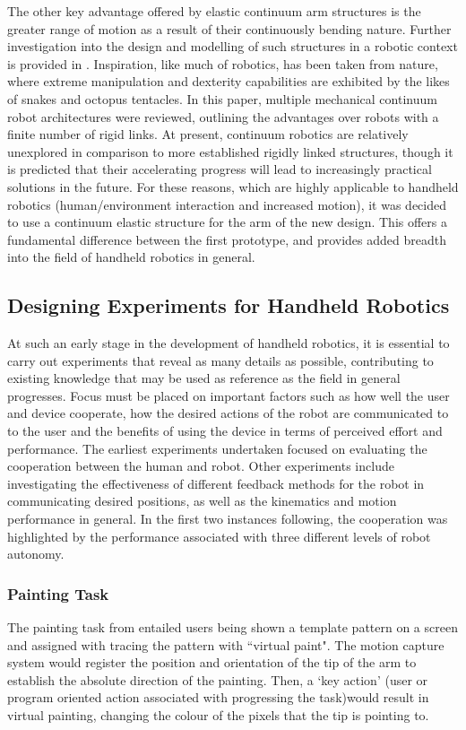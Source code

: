 \documentclass[11pt]{article}
\begin{document}
The other key advantage offered by elastic continuum arm structures is the greater range of motion as a result of their continuously bending nature. Further investigation into the design and modelling of such structures in a robotic context is provided in \cite{webster2010}. Inspiration, like much of robotics, has been taken from nature, where extreme manipulation and dexterity capabilities are exhibited by the likes of snakes and octopus tentacles. In this paper, multiple mechanical continuum robot architectures were reviewed, outlining the advantages over robots with a finite number of rigid links. At present, continuum robotics are relatively unexplored in comparison to more established rigidly linked structures, though it is predicted that their accelerating progress will lead to increasingly practical solutions in the future. For these reasons, which are highly applicable to handheld robotics (human/environment interaction and increased motion), it was decided to use a continuum elastic structure for the arm of the new design. This offers a fundamental difference between the first prototype, and provides added breadth into the field of handheld robotics in general.




\subsection{Designing Experiments for Handheld Robotics} \label{designingexperiments}
At such an early stage in the development of handheld robotics, it is essential to carry out experiments that reveal as many details as possible, contributing to existing knowledge that may be used as reference as the field in general progresses. Focus must be placed on important factors such as how well the user and device cooperate, how the desired actions of the robot are communicated to to the user and the benefits of using the device in terms of perceived effort and performance. The earliest experiments undertaken focused on evaluating the cooperation between the human and robot. Other experiments include investigating the effectiveness of different feedback methods for the robot in communicating desired positions, as well as the kinematics and motion performance in general. In the first two instances following, the cooperation was highlighted by the performance associated with three different levels of robot autonomy.

\subsubsection{Painting Task}
The painting task from \cite{GreggSmithDesign} entailed users being shown a template pattern on a screen and assigned with tracing the pattern with ``virtual paint". The motion capture system would register the position and orientation of the tip of the arm to establish the absolute direction of the painting. Then, a `key action' (user or program oriented action associated with progressing the task)would result in virtual painting, changing the colour of the pixels that the tip is pointing to. 
\end{document}
